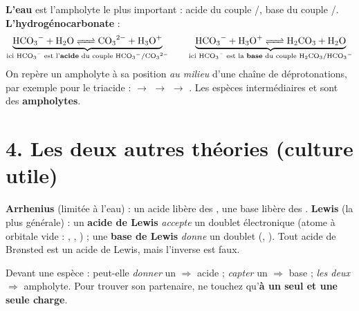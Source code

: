 \documentclass[11pt,a4paper]{article}
\begin{document}
\begin{exemple}
\textbf{L'eau} est l'ampholyte le plus important : acide du couple /, base du couple
/.\\[2pt]
\textbf{L'hydrogénocarbonate } :
\[ \underbrace{\ce{HCO3- + H2O <=> CO3^{2-} + H3O+}}_{\text{ici \ce{HCO3-} est l'\textbf{acide} du couple }\ce{HCO3-}/\ce{CO3^{2-}}} \qquad
   \underbrace{\ce{HCO3- + H3O+ <=> H2CO3 + H2O}}_{\text{ici \ce{HCO3-} est la \textbf{base} du couple }\ce{H2CO3}/\ce{HCO3-}} \]
On repère un ampholyte à sa position \emph{au milieu} d'une chaîne de déprotonations, par exemple pour le
triacide  :  $\to$  $\to$  $\to$ . Les espèces
intermédiaires  et  sont des \textbf{ampholytes}.
\end{exemple}

\section*{4. Les deux autres théories (culture utile)}

\textbf{Arrhenius} (limitée à l'eau) : un acide libère des , une base libère des .
\quad\textbf{Lewis} (la plus générale) : un \textbf{acide de Lewis} \emph{accepte} un doublet électronique
(atome à orbitale vide : , , ) ; une \textbf{base de Lewis} \emph{donne} un doublet
(, ). Tout acide de Brønsted est un acide de Lewis, mais l'inverse est faux.

\begin{methode}
Devant une espèce : peut-elle \emph{donner} un  $\Rightarrow$ acide ; \emph{capter} un 
$\Rightarrow$ base ; \emph{les deux} $\Rightarrow$ ampholyte. Pour trouver son partenaire, ne touchez qu'\textbf{à
un seul  et une seule charge}.
\end{methode}
\end{document}
